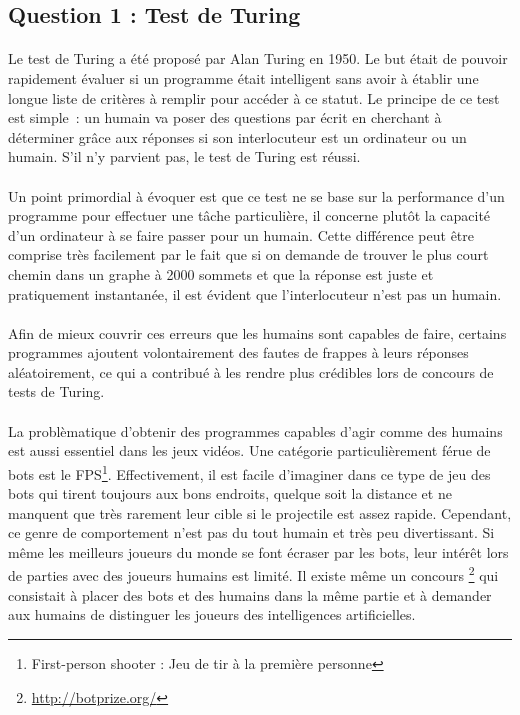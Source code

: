 \subsection{Question 1 : Test de Turing}
\paragraph{}
Le test de Turing a été proposé par Alan Turing en 1950. Le but était de
pouvoir rapidement évaluer si un programme était intelligent sans avoir à
établir une longue liste de critères à remplir pour accéder à ce statut. Le
principe de ce test est simple~: un humain va poser des questions par écrit en
cherchant à déterminer grâce aux réponses si son interlocuteur est un ordinateur
ou un humain. S'il n'y parvient pas, le test de Turing est réussi.

\paragraph{}
Un point primordial à évoquer est que ce test ne se base sur la performance d'un
programme pour effectuer une tâche particulière, il concerne plutôt la capacité
d'un ordinateur à se faire passer pour un humain. Cette différence peut être
comprise très facilement par le fait que si on demande de trouver le plus
court chemin dans un graphe à 2000 sommets et que la réponse est juste et
pratiquement instantanée, il est évident que l'interlocuteur n'est pas un
humain.

\paragraph{}
Afin de mieux couvrir ces erreurs que les humains sont capables de faire,
certains programmes ajoutent volontairement des fautes de frappes à leurs
réponses aléatoirement, ce qui a contribué à les rendre plus crédibles lors de
concours de tests de Turing.

\paragraph{}
La problèmatique d'obtenir des programmes capables d'agir comme des humains est
aussi essentiel dans les jeux vidéos. Une catégorie particulièrement férue de
bots est le FPS\footnote{First-person shooter : Jeu de tir à la première
personne}. Effectivement, il est facile d'imaginer dans ce type de jeu des bots
qui tirent toujours aux bons endroits, quelque soit la distance et ne manquent
que très rarement leur cible si le projectile est assez rapide. Cependant, ce
genre de comportement n'est pas du tout humain et très peu divertissant. Si même
les meilleurs joueurs du monde se font écraser par les bots, leur intérêt lors
de parties avec des joueurs humains est limité. Il existe même un concours
\footnote{\url{http://botprize.org/}} qui consistait à placer des bots et des
humains dans la même partie et à demander aux humains de distinguer les joueurs
des intelligences artificielles.


